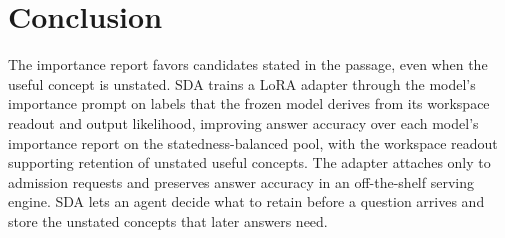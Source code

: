 \section{Conclusion}
\label{sec:conclusion}

The importance report favors candidates stated in the passage, even
when the useful concept is unstated.
SDA trains a LoRA adapter through the model's importance prompt on
labels that the frozen model derives from its workspace readout and
output likelihood, improving answer accuracy over each model's
importance report on the statedness-balanced pool, with the workspace
readout supporting retention of unstated useful concepts.
The adapter attaches only to admission requests and preserves answer
accuracy in an off-the-shelf serving engine.
SDA lets an agent decide what to retain before a question arrives and
store the unstated concepts that later answers need.
